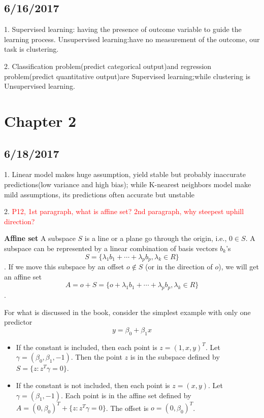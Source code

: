 \documentclass[a4paper, 12pt]{article}
\begin{document}
\subsection*{6/16/2017}

1. Supervised learning: having the presence of outcome variable to guide the learning process. Unsupervised learning:have no measurement of the outcome, our task is clustering.

2. Classification problem(predict categorical output)and regression problem(predict quantitative output)are Supervised learning;while clustering is Unsupervised learning.

\section*{Chapter 2}
\subsection*{6/18/2017}

1. Linear model  makes huge assumption, yield stable but probably inaccurate predictions(low variance and high bias); while K-nearest neighbors model make mild assumptions, its predictions often accurate but unstable

2. \textcolor{red}{ P12,  1st paragraph, what is affine set? 	2nd paragraph, why steepest uphill direction?}

\textbf{Affine set} A subspace $S$ is a line or a plane go through the origin, i.e., $0\in S$. A subspace can be represented by a linear combination of basis vectors $b_k$'s
$$S = \{\lambda_1 b_1+\cdots+\lambda_p b_p, \lambda_k\in R\}$$.
If we move this subspace by an offset $o\notin S$ (or in the direction of $o$), we will get an affine set
$$A = o+S = \{o+\lambda_1 b_1+\cdots+\lambda_p b_p, \lambda_k\in R\}$$.

For what is discussed in the book, consider the simplest example with only one predictor
$$
y = \beta_0 + \beta_1 x
$$
\begin{itemize}
	\item If the constant is included, then each point is $z = (1,x,y)^T$. Let $\gamma = (\beta_0, \beta_1, -1)$. Then the point $z$ is in the subspace defined by $S = \{z: z^T\gamma = 0\}$.
	\item  If the constant is not included, then each point is $z = (x,y)$. Let $\gamma = (\beta_1, -1)$. Each point is in the affine set defined by $A = (0, \beta_0)^T + \{
	z: z^T\gamma = 0\}$. The offset is $o=(0, \beta_0)^T$.
\end{itemize}
\end{document}
